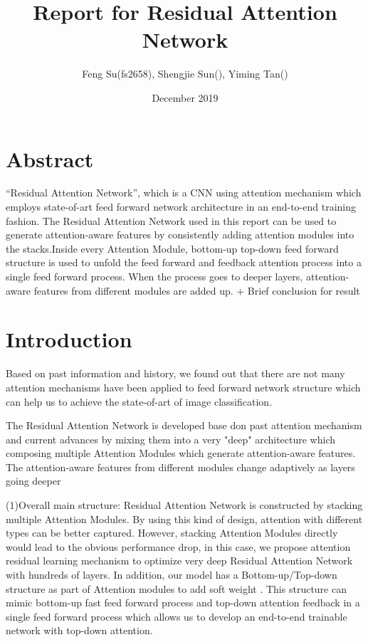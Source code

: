 \documentclass{article}
\title{Report for Residual Attention Network}
\author{Feng Su(fs2658), Shengjie Sun(), Yiming Tan() }
\date{December 2019}
\begin{document}
\maketitle
\begin{multicols}{2}

\section{Abstract}
  “Residual Attention Network”, which is
a CNN using attention mechanism which employs state-of-art feed forward network architecture in an end-to-end training fashion.
The Residual Attention Network used in this report can be used to generate attention-aware features by consistently adding attention modules into the stacks.Inside every Attention
Module, bottom-up top-down feed forward structure is used
to unfold the feed forward and feedback attention process
into a single feed forward process. When the process goes to deeper layers, attention-aware features from different modules are added up.
+ Brief conclusion for result

\section{Introduction}

Based on past information and history, we found out that there are not many attention mechanisms have been applied to feed forward network structure which can help us to achieve the state-of-art of image classification.

The Residual Attention Network is developed base don past attention mechanism and current advances by mixing them into a very "deep" architecture which composing multiple Attention Modules which generate attention-aware features. The attention-aware features from different modules change adaptively as layers going deeper


(1)Overall main structure:
Residual Attention Network is constructed by stacking multiple Attention Modules. By using this kind of design, attention with different types can be better captured. However, stacking Attention Modules directly would lead to the obvious performance drop, in this case, we propose attention residual learning mechanism to optimize very deep Residual Attention Network with hundreds of layers. In addition, our model has a Bottom-up/Top-down structure as part of Attention modules to add soft weight . This structure can mimic bottom-up fast feed forward process and top-down attention feedback in a single feed forward process which allows us to develop an end-to-end trainable network with top-down attention. 


\end{multicols}
\end{document}
